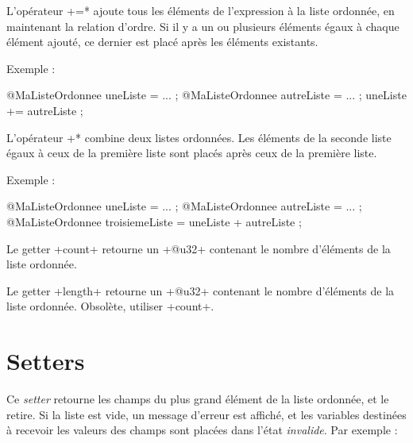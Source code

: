 
L'opérateur \ggsq*+=* ajoute tous les éléments de l'expression à la liste ordonnée, en maintenant la relation d'ordre. Si il y a un ou plusieurs éléments égaux à chaque élément ajouté, ce dernier est placé après les éléments existants.

Exemple :
\begin{galgas4}
@MaListeOrdonnee uneListe = ... ;
@MaListeOrdonnee autreListe = ... ;
uneListe += autreListe ;
\end{galgas4}


L'opérateur \ggsq*+* combine deux listes ordonnées. Les éléments de la seconde liste égaux à ceux de la première liste sont placés après ceux de la première liste.

Exemple :
\begin{galgas4}
@MaListeOrdonnee uneListe = ... ;
@MaListeOrdonnee autreListe = ... ;
@MaListeOrdonnee troisiemeListe = uneListe + autreListe ;
\end{galgas4}








Le getter \ggsq+count+ retourne un \ggsq+@u32+ contenant le nombre d'éléments de la liste ordonnée.









Le getter \ggsq+length+ retourne un \ggsq+@u32+ contenant le nombre d'éléments de la liste ordonnée. Obsolète, utiliser \ggsq+count+.






\section{Setters}


Ce \emph{setter} retourne les champs du plus grand élément de la liste ordonnée, et le retire. Si la liste est vide, un message d'erreur est affiché, et les variables destinées à recevoir les valeurs des champs sont placées dans l'état \emph{invalide}. Par exemple :

